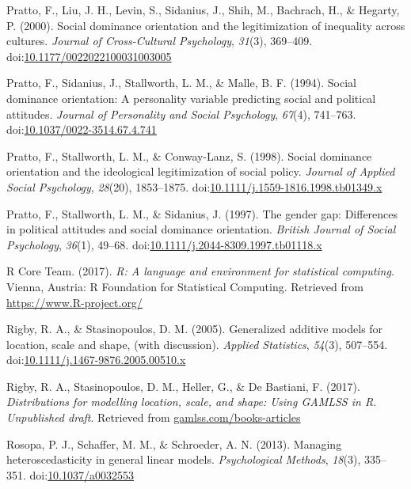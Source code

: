 \documentclass[english,,man]{apa6}
\begin{document}
\leavevmode\hypertarget{ref-pratto2000social}{}%
Pratto, F., Liu, J. H., Levin, S., Sidanius, J., Shih, M., Bachrach, H., \& Hegarty, P. (2000). Social dominance orientation and the legitimization of inequality across cultures. \emph{Journal of Cross-Cultural Psychology}, \emph{31}(3), 369--409. doi:\href{https://doi.org/10.1177/0022022100031003005}{10.1177/0022022100031003005}

\leavevmode\hypertarget{ref-pratto1994social}{}%
Pratto, F., Sidanius, J., Stallworth, L. M., \& Malle, B. F. (1994). Social dominance orientation: A personality variable predicting social and political attitudes. \emph{Journal of Personality and Social Psychology}, \emph{67}(4), 741--763. doi:\href{https://doi.org/10.1037/0022-3514.67.4.741}{10.1037/0022-3514.67.4.741}

\leavevmode\hypertarget{ref-pratto1998social}{}%
Pratto, F., Stallworth, L. M., \& Conway-Lanz, S. (1998). Social dominance orientation and the ideological legitimization of social policy. \emph{Journal of Applied Social Psychology}, \emph{28}(20), 1853--1875. doi:\href{https://doi.org/10.1111/j.1559-1816.1998.tb01349.x}{10.1111/j.1559-1816.1998.tb01349.x}

\leavevmode\hypertarget{ref-pratto1997gender}{}%
Pratto, F., Stallworth, L. M., \& Sidanius, J. (1997). The gender gap: Differences in political attitudes and social dominance orientation. \emph{British Journal of Social Psychology}, \emph{36}(1), 49--68. doi:\href{https://doi.org/10.1111/j.2044-8309.1997.tb01118.x}{10.1111/j.2044-8309.1997.tb01118.x}

\leavevmode\hypertarget{ref-rcore2017}{}%
R Core Team. (2017). \emph{R: A language and environment for statistical computing}. Vienna, Austria: R Foundation for Statistical Computing. Retrieved from \url{https://www.R-project.org/}

\leavevmode\hypertarget{ref-rigby2005generalized}{}%
Rigby, R. A., \& Stasinopoulos, D. M. (2005). Generalized additive models for location, scale and shape, (with discussion). \emph{Applied Statistics}, \emph{54}(3), 507--554. doi:\href{https://doi.org/10.1111/j.1467-9876.2005.00510.x}{10.1111/j.1467-9876.2005.00510.x}

\leavevmode\hypertarget{ref-rigby2017distributions}{}%
Rigby, R. A., Stasinopoulos, D. M., Heller, G., \& De Bastiani, F. (2017). \emph{Distributions for modelling location, scale, and shape: Using GAMLSS in R. Unpublished draft}. Retrieved from \url{gamlss.com/books-articles}

\leavevmode\hypertarget{ref-rosopa2013managing}{}%
Rosopa, P. J., Schaffer, M. M., \& Schroeder, A. N. (2013). Managing heteroscedasticity in general linear models. \emph{Psychological Methods}, \emph{18}(3), 335--351. doi:\href{https://doi.org/10.1037/a0032553}{10.1037/a0032553}
\end{document}
